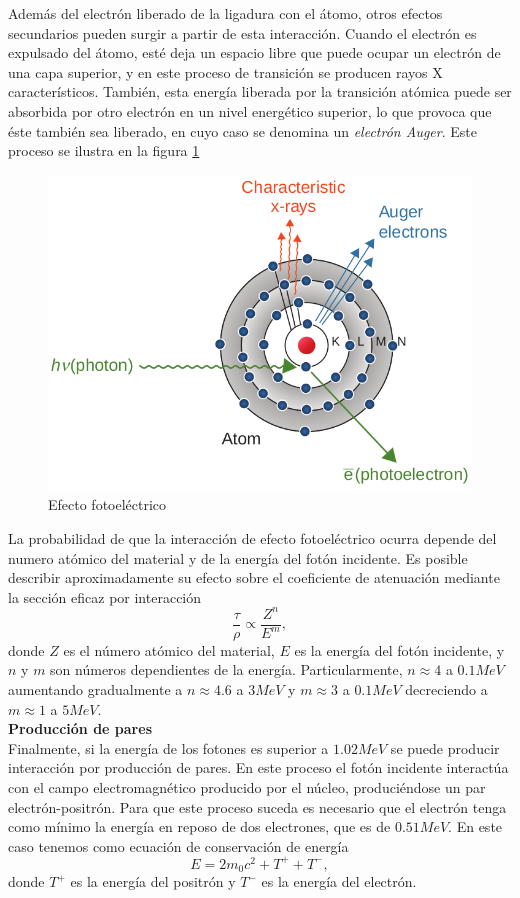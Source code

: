 Además del electrón liberado de la ligadura con el átomo, otros efectos secundarios pueden surgir a partir de esta interacción. Cuando el electrón es expulsado del átomo, esté deja un espacio libre que puede ocupar un electrón de una capa superior, y en este proceso de transición se producen rayos X característicos. También, esta energía liberada por la transición atómica puede ser absorbida por otro electrón en un nivel energético superior, lo que provoca que éste también sea liberado, en cuyo caso se denomina un \textit{electrón Auger}. Este proceso se ilustra en la figura \ref{fig:fotoelectrico}\\
\begin{figure}[H]
	\centering
	\includegraphics[width=0.7\linewidth]{images/fotoelectrico.png}
	\caption{Efecto fotoeléctrico}
	\label{fig:fotoelectrico}
\end{figure}

La probabilidad de que la interacción de efecto fotoeléctrico ocurra depende del numero atómico del material y de la energía del fotón incidente. Es posible describir aproximadamente su efecto sobre el coeficiente de atenuación mediante la sección eficaz por interacción
\begin{equation}
	\frac{\tau}{\rho}\propto \frac{Z^n}{E^m},
\end{equation} 
donde $Z$ es el número atómico del material, $E$ es la energía del fotón incidente, y $n$ y $m$ son números dependientes de la energía. Particularmente, $n\approx 4$ a $0.1MeV$ aumentando gradualmente a $n\approx4.6$ a $3MeV$ y $m\approx3$ a $0.1MeV$ decreciendo a $m\approx1$ a $5MeV$.\\

\textbf{Producción de pares}\\

Finalmente, si la energía de los fotones es superior a $1.02MeV$ se puede producir interacción por producción de pares. En este proceso el fotón incidente interactúa con el campo electromagnético producido por el núcleo, produciéndose un par electrón-positrón. Para que este proceso suceda es necesario que el electrón tenga como mínimo la energía en reposo de dos electrones, que es de $0.51MeV$. En este caso tenemos como ecuación de conservación de energía
\begin{equation}
	E=2m_0c^2+T^{+}+T^{-},
\end{equation}
donde $T^{+}$ es la energía del positrón y $T^{-}$ es la energía del electrón.\\

